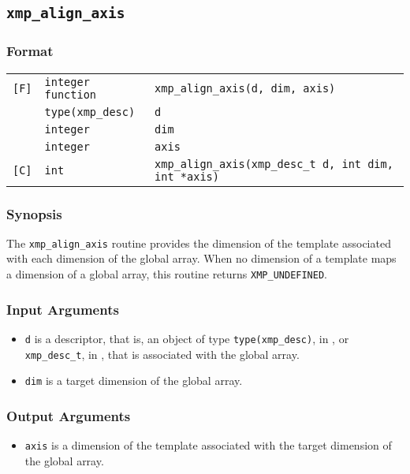 \subsection{\tt xmp\_align\_axis}

\subsubsection*{Format}

\begin{tabular}{lll}

\verb![F]!& {\tt integer function}& {\tt xmp\_align\_axis(d, dim, axis)}\\
          & {\tt type(xmp\_desc)} & {\tt d}\\
          & {\tt integer} & {\tt dim}\\
          & {\tt integer} & {\tt axis}\\

\verb![C]!&  {\tt int}& {\tt xmp\_align\_axis(xmp\_desc\_t d, int dim, int *axis)}\\

\end{tabular}

\subsubsection*{Synopsis}

The {\tt xmp\_align\_axis} routine provides the dimension of the template associated with each dimension of the global array. When no dimension of a template maps a dimension of a global array, this routine returns {\tt XMP\_UNDEFINED}.


\subsubsection*{Input Arguments}
\begin{itemize}
 \item {\tt d} is a descriptor, that is, an object of type 
       {\tt type(xmp\_desc)}, in {\XMPF}, or {\tt xmp\_desc\_t},
       in {\XMPC}, that is associated with the global array.
 \item {\tt dim} is a target dimension of the global array.
\end{itemize}

\subsubsection*{Output Arguments}
\begin{itemize}
 \item {\tt axis} is a dimension of the template associated with the target dimension of the global array.
\end{itemize}


